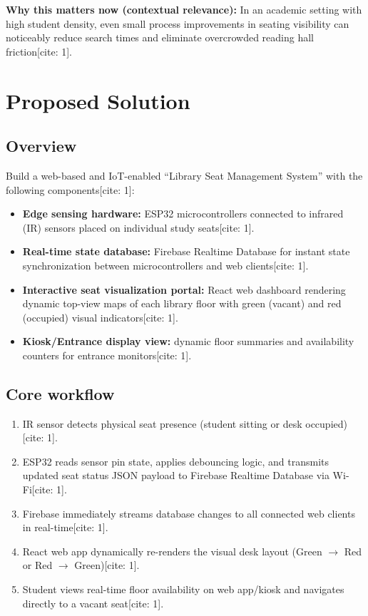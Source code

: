 \documentclass[11pt,a4paper]{article}
\begin{document}
\textbf{Why this matters now (contextual relevance):} In an academic setting with high student density, even small process improvements in seating visibility can noticeably reduce search times and eliminate overcrowded reading hall friction[cite: 1].

\section{Proposed Solution}
\subsection{Overview}
Build a web-based and IoT-enabled ``Library Seat Management System'' with the following components[cite: 1]:
\begin{itemize}[leftmargin=0.7cm]
    \item \textbf{Edge sensing hardware:} ESP32 microcontrollers connected to infrared (IR) sensors placed on individual study seats[cite: 1].
    \item \textbf{Real-time state database:} Firebase Realtime Database for instant state synchronization between microcontrollers and web clients[cite: 1].
    \item \textbf{Interactive seat visualization portal:} React web dashboard rendering dynamic top-view maps of each library floor with green (vacant) and red (occupied) visual indicators[cite: 1].
    \item \textbf{Kiosk/Entrance display view:} dynamic floor summaries and availability counters for entrance monitors[cite: 1].
\end{itemize}

\subsection{Core workflow}
\begin{enumerate}[leftmargin=0.7cm]
    \item IR sensor detects physical seat presence (student sitting or desk occupied)[cite: 1].
    \item ESP32 reads sensor pin state, applies debouncing logic, and transmits updated seat status JSON payload to Firebase Realtime Database via Wi-Fi[cite: 1].
    \item Firebase immediately streams database changes to all connected web clients in real-time[cite: 1].
    \item React web app dynamically re-renders the visual desk layout (Green $\rightarrow$ Red or Red $\rightarrow$ Green)[cite: 1].
    \item Student views real-time floor availability on web app/kiosk and navigates directly to a vacant seat[cite: 1].
\end{enumerate}
\end{document}
